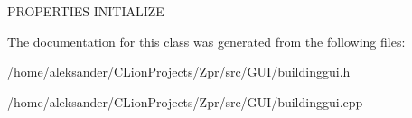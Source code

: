 P\-R\-O\-P\-E\-R\-T\-I\-E\-S I\-N\-I\-T\-I\-A\-L\-I\-Z\-E 

The documentation for this class was generated from the following files\-:\begin{DoxyCompactItemize}
\item 
/home/aleksander/\-C\-Lion\-Projects/\-Zpr/src/\-G\-U\-I/buildinggui.\-h\item 
/home/aleksander/\-C\-Lion\-Projects/\-Zpr/src/\-G\-U\-I/buildinggui.\-cpp\end{DoxyCompactItemize}
